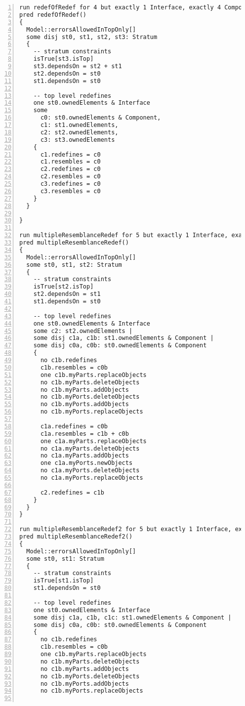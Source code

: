 \begin{lstlisting}[caption={unittests\_redefinition.als}, numbers=left]
run redefOfRedef for 4 but exactly 1 Interface, exactly 4 Component, exactly 5 Element, exactly 4 Stratum
pred redefOfRedef()
{
  Model::errorsAllowedInTopOnly[]
  some disj st0, st1, st2, st3: Stratum
  {
    -- stratum constraints
    isTrue[st3.isTop]
    st3.dependsOn = st2 + st1
    st2.dependsOn = st0
    st1.dependsOn = st0

    -- top level redefines
    one st0.ownedElements & Interface
    some
      c0: st0.ownedElements & Component,
      c1: st1.ownedElements,
      c2: st2.ownedElements,
      c3: st3.ownedElements
    {
      c1.redefines = c0
      c1.resembles = c0
      c2.redefines = c0
      c2.resembles = c0
      c3.redefines = c0
      c3.resembles = c0
    }
  }
  
}

run multipleResemblanceRedef for 5 but exactly 1 Interface, exactly 5 Component, exactly 3 Stratum, 18 LinkEnd
pred multipleResemblanceRedef()
{
  Model::errorsAllowedInTopOnly[]
  some st0, st1, st2: Stratum
  {
    -- stratum constraints
    isTrue[st2.isTop]
    st2.dependsOn = st1
    st1.dependsOn = st0

    -- top level redefines
    one st0.ownedElements & Interface
    some c2: st2.ownedElements |
    some disj c1a, c1b: st1.ownedElements & Component |
    some disj c0a, c0b: st0.ownedElements & Component
    {
      no c1b.redefines
      c1b.resembles = c0b
      one c1b.myParts.replaceObjects
      no c1b.myParts.deleteObjects
      no c1b.myParts.addObjects
      no c1b.myPorts.deleteObjects
      no c1b.myPorts.addObjects
      no c1b.myPorts.replaceObjects
      
      c1a.redefines = c0b
      c1a.resembles = c1b + c0b
      one c1a.myParts.replaceObjects
      no c1a.myParts.deleteObjects
      no c1a.myParts.addObjects
      one c1a.myPorts.newObjects
      no c1a.myPorts.deleteObjects
      no c1a.myPorts.replaceObjects

      c2.redefines = c1b
    }
  }
}

run multipleResemblanceRedef2 for 5 but exactly 1 Interface, exactly 5 Component, exactly 2 Stratum, 8 LinkEnd
pred multipleResemblanceRedef2()
{
  Model::errorsAllowedInTopOnly[]
  some st0, st1: Stratum
  {
    -- stratum constraints
    isTrue[st1.isTop]
    st1.dependsOn = st0

    -- top level redefines
    one st0.ownedElements & Interface
    some disj c1a, c1b, c1c: st1.ownedElements & Component |
    some disj c0a, c0b: st0.ownedElements & Component
    {
      no c1b.redefines
      c1b.resembles = c0b
      one c1b.myParts.replaceObjects
      no c1b.myParts.deleteObjects
      no c1b.myParts.addObjects
      no c1b.myPorts.deleteObjects
      no c1b.myPorts.addObjects
      no c1b.myPorts.replaceObjects
      

\end{lstlisting}
